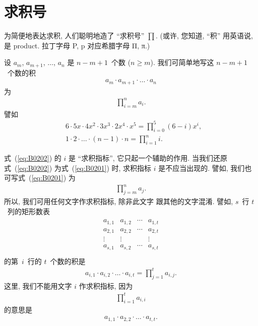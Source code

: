 \documentclass[%
    UTF8,%
    fontset=none,%
    punct=kaiming,%
    zihao=-4,%
    a4paper,%
    oneside,%
]{ctexbook}
\renewcommand*{\geq}{\geqslant}
\begin{document}
\section{求积号}

为简便地表达求积,
人们聪明地造了 ``求积号'' \(\prod\).
(或许, 您知道, ``积'' 用英语说, 是 product.
拉丁字母 P, p 对应希腊字母 Π, π.)

设 \(a_m\), \(a_{m+1}\), \(\dots\), \(a_n\) 是
\(n - m + 1\)~个数 (\(n \geq m\)).
我们可简单地写这 \(n - m + 1\)~个数的积
\begin{align}
    a_m \cdot a_{m+1} \cdot \dots \cdot a_n
    \label{eq:B0201}
\end{align}
为
\begin{align}
    \prod_{i = m}^{n} {a_i}.
    \label{eq:B0202}
\end{align}
譬如
\begin{align*}
     & 6 \cdot 5x \cdot 4x^2 \cdot 3x^3 \cdot 2x^4 \cdot x^5
    = \prod_{i = 0}^{5} {(6 - i)x^i},                        \\
     & 1 \cdot 2 \cdot \dots \cdot (n - 1) \cdot n
    = \prod_{i = 1}^{n} {i}.
\end{align*}

式~(\ref{eq:B0202}) 的 \(i\) 是 ``求积指标'',
它只起一个辅助的作用.
当我们还原式~(\ref{eq:B0202})
为式~(\ref{eq:B0201}) 时,
求积指标 \(i\) 是不应当出现的.
譬如, 我们也可写式~(\ref{eq:B0201}) 为
\begin{align*}
    \prod_{j = m}^{n} {a_j}.
\end{align*}
所以, 我们可用任何文字作求积指标, 除非此文字%
跟其他的文字混淆.
譬如, \(s\)~行 \(t\)~列的矩形数表
\begin{align}
    \begin{matrix}
        a_{1,1} & a_{1,2} & \cdots & a_{1,t} \\
        a_{2,1} & a_{2,2} & \cdots & a_{2,t} \\
        \vdots  & \vdots  & {}     & \vdots  \\
        a_{s,1} & a_{s,2} & \cdots & a_{s,t} \\
    \end{matrix}
    \label{eq:B0203}
\end{align}
的第~\(i\)~行的 \(t\)~个数的积是
\begin{align*}
    a_{i,1} \cdot a_{i,2} \cdot \dots \cdot a_{i,t}
    = \prod_{j = 1}^{t} {a_{i,j}}.
\end{align*}
这里, 我们不能用文字 \(i\) 作求积指标,
因为
\begin{align*}
    \prod_{i = 1}^{t} {a_{i,i}}
\end{align*}
的意思是
\begin{align*}
    a_{1,1} \cdot a_{2,2} \cdot \dots \cdot a_{t,t}.
\end{align*}
\end{document}
